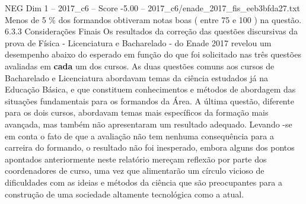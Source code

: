 \begin{textsample}{NEG Dim 1 – 2017\_c6 – Score -5.00 – 2017\_c6/enade\_2017\_fis\_eeb3bfda27.txt}
Menos de 5 \% dos formandos obtiveram notas boas ( entre 75 e 100 ) na questão. 6.3.3 Considerações Finais Os resultados da correção das questões discursivas da prova de Física - Licenciatura e Bacharelado - do Enade 2017 revelou um desempenho abaixo do esperado em função do que foi solicitado nas três questões avaliadas em \textbf{cada} um dos cursos.
As duas questões comuns aos cursos de Bacharelado e Licenciatura abordavam temas da ciência estudados já na Educação Básica, e que constituem conhecimentos e métodos de abordagem das situações fundamentais para os formandos da Área.
A última questão, diferente para os dois cursos, abordavam temas mais específicos da formação mais avançada, mas também não apresentaram um resultado adequado.
Levando -se em conta o fato de que a avaliação não tem nenhuma consequência para a carreira do formando, o resultado não foi inesperado, embora alguns dos pontos apontados anteriormente neste relatório mereçam reflexão por parte dos coordenadores de curso, uma vez que alimentarão um círculo vicioso de dificuldades com as ideias e métodos da ciência que são preocupantes para a construção de uma sociedade altamente tecnológica como a atual.

\end{textsample}
